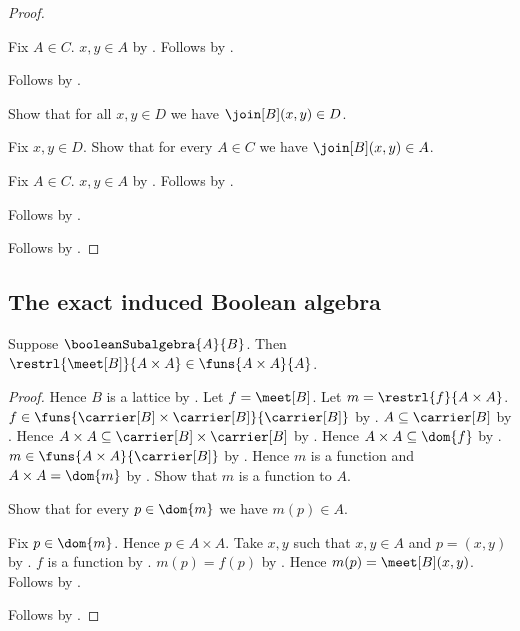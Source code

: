 \begin{proof}
\begin{subproof}
\begin{subproof}
            Fix $A\in C$.
            $x,y\in A$ by .
            Follows by .
        \end{subproof}
        Follows by .
    \end{subproof}
    Show that for all $x,y\in D$ we have $\join[B](x,y)\in D$.
    \begin{subproof}
        Fix $x,y\in D$.
        Show that for every $A\in C$ we have $\join[B](x,y)\in A$.
        \begin{subproof}
            Fix $A\in C$.
            $x,y\in A$ by .
            Follows by .
        \end{subproof}
        Follows by .
    \end{subproof}
    Follows by .
\end{proof}

\subsection{The exact induced Boolean algebra}

\begin{proposition}\label{boolean_subalgebra_meet_restriction_type}
    Suppose $\booleanSubalgebra{A}{B}$.
    Then $\restrl{\meet[B]}{A\times A}\in\funs{A\times A}{A}$.
\end{proposition}
\begin{proof}
    Hence $B$ is a lattice by .
    Let $f=\meet[B]$.
    Let $m=\restrl{f}{A\times A}$.
    $f\in\funs{\carrier[B]\times\carrier[B]}{\carrier[B]}$ by
        .
    $A\subseteq\carrier[B]$ by .
    Hence $A\times A\subseteq\carrier[B]\times\carrier[B]$ by
        .
    Hence $A\times A\subseteq\dom{f}$ by .
    $m\in\funs{A\times A}{\carrier[B]}$ by .
    Hence $m$ is a function and $A\times A=\dom{m}$ by
        .
    Show that $m$ is a function to $A$.
    \begin{subproof}
        Show that for every $p\in\dom{m}$ we have $m(p)\in A$.
        \begin{subproof}
            Fix $p\in\dom{m}$.
            Hence $p\in A\times A$.
            Take $x,y$ such that $x,y\in A$ and $p=(x,y)$ by
                .
            $f$ is a function by .
            $m(p)=f(p)$ by .
            Hence $m(p)=\meet[B](x,y)$.
            Follows by .
        \end{subproof}
    \end{subproof}
    Follows by .
\end{proof}

